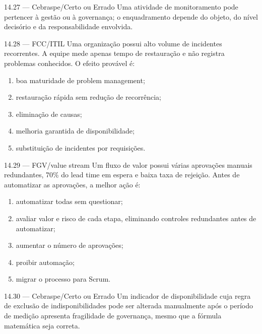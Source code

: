 \begin{questao}{ 14.27 — Cebraspe/Certo ou Errado}
Uma atividade de monitoramento pode pertencer à gestão ou à governança; o enquadramento depende do objeto, do nível decisório e da responsabilidade envolvida.
\end{questao}

\begin{questao}{ 14.28 — FCC/ITIL}
Uma organização possui alto volume de incidentes recorrentes. A equipe mede apenas tempo de restauração e não registra problemas conhecidos. O efeito provável é:
\begin{enumerate}[label=\Alph*)]
\item boa maturidade de problem management;
\item restauração rápida sem redução de recorrência;
\item eliminação de causas;
\item melhoria garantida de disponibilidade;
\item substituição de incidentes por requisições.
\end{enumerate}
\end{questao}

\begin{questao}{ 14.29 — FGV/value stream}
Um fluxo de valor possui várias aprovações manuais redundantes, 70\% do lead time em espera e baixa taxa de rejeição. Antes de automatizar as aprovações, a melhor ação é:
\begin{enumerate}[label=\Alph*)]
\item automatizar todas sem questionar;
\item avaliar valor e risco de cada etapa, eliminando controles redundantes antes de automatizar;
\item aumentar o número de aprovações;
\item proibir automação;
\item migrar o processo para Scrum.
\end{enumerate}
\end{questao}

\begin{questao}{ 14.30 — Cebraspe/Certo ou Errado}
Um indicador de disponibilidade cuja regra de exclusão de indisponibilidades pode ser alterada manualmente após o período de medição apresenta fragilidade de governança, mesmo que a fórmula matemática seja correta.
\end{questao}

